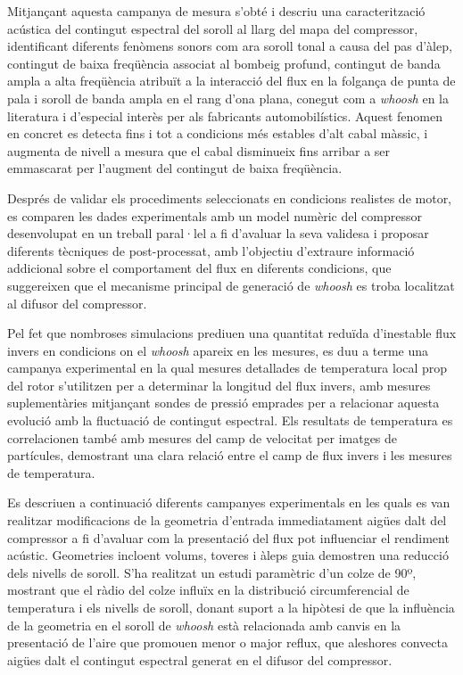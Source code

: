Mitjançant aquesta campanya de mesura s'obté i descriu una caracterització acústica del contingut espectral del soroll al llarg del mapa del compressor, identificant diferents fenòmens sonors com ara soroll tonal a causa del pas d'àlep, contingut de baixa freqüència associat al bombeig profund, contingut de banda ampla a alta freqüència atribuït a la interacció del flux en la folgança de punta de pala i soroll de banda ampla en el rang d'ona plana, conegut com a \emph{whoosh} en la literatura i d'especial interès per als fabricants automobilístics. Aquest fenomen en concret es detecta fins i tot a condicions més estables d'alt cabal màssic, i augmenta de nivell a mesura que el cabal disminueix fins arribar a ser emmascarat per l'augment del contingut de baixa freqüència.

Després de validar els procediments seleccionats en condicions realistes de motor, es comparen les dades experimentals amb un model numèric del compressor desenvolupat en un treball paral·lel a fi d'avaluar la seva validesa i proposar diferents tècniques de post-processat, amb l'objectiu d'extraure informació addicional sobre el comportament del flux en diferents condicions, que suggereixen que el mecanisme principal de generació de \emph{whoosh} es troba localitzat al difusor del compressor.

Pel fet que nombroses simulacions prediuen una quantitat reduïda d'inestable flux invers en condicions on el \emph{whoosh} apareix en les mesures, es duu a terme una campanya experimental en la qual mesures detallades de temperatura local prop del rotor s'utilitzen per a determinar la longitud del flux invers, amb mesures suplementàries mitjançant sondes de pressió emprades per a relacionar aquesta evolució amb la fluctuació de contingut espectral. Els resultats de temperatura es correlacionen també amb mesures del camp de velocitat per imatges de partícules, demostrant una clara relació entre el camp de flux invers i les mesures de temperatura.

Es descriuen a continuació diferents campanyes experimentals en les quals es van realitzar modificacions de la geometria d'entrada immediatament aigües dalt del compressor a fi d'avaluar com la presentació del flux pot influenciar el rendiment acústic. Geometries incloent volums, toveres i àleps guia demostren una reducció dels nivells de soroll. S'ha realitzat un estudi paramètric d'un colze de 90º, mostrant que el ràdio del colze influïx en la distribució circumferencial de temperatura i els nivells de soroll, donant suport a la hipòtesi de que la influència de la geometria en el soroll de \emph{whoosh} està relacionada amb canvis en la presentació de l'aire que promouen menor o major reflux, que aleshores convecta aigües dalt el contingut espectral generat en el difusor del compressor.

\cleardoublepage